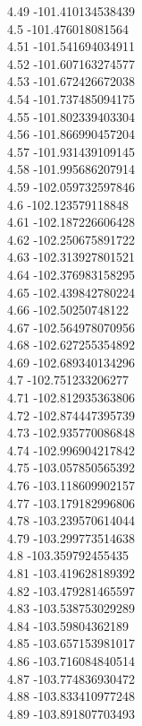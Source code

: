 {4.49	-101.410134538439\\
4.5	-101.476018081564\\
4.51	-101.541694034911\\
4.52	-101.607163274577\\
4.53	-101.672426672038\\
4.54	-101.737485094175\\
4.55	-101.802339403304\\
4.56	-101.866990457204\\
4.57	-101.931439109145\\
4.58	-101.995686207914\\
4.59	-102.059732597846\\
4.6	-102.123579118848\\
4.61	-102.187226606428\\
4.62	-102.250675891722\\
4.63	-102.313927801521\\
4.64	-102.376983158295\\
4.65	-102.439842780224\\
4.66	-102.50250748122\\
4.67	-102.564978070956\\
4.68	-102.627255354892\\
4.69	-102.689340134296\\
4.7	-102.751233206277\\
4.71	-102.812935363806\\
4.72	-102.874447395739\\
4.73	-102.935770086848\\
4.74	-102.996904217842\\
4.75	-103.057850565392\\
4.76	-103.118609902157\\
4.77	-103.179182996806\\
4.78	-103.239570614044\\
4.79	-103.299773514638\\
4.8	-103.359792455435\\
4.81	-103.419628189392\\
4.82	-103.479281465597\\
4.83	-103.538753029289\\
4.84	-103.59804362189\\
4.85	-103.657153981017\\
4.86	-103.716084840514\\
4.87	-103.774836930472\\
4.88	-103.833410977248\\
4.89	-103.891807703493\\
}
